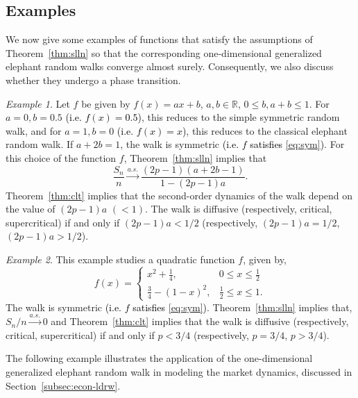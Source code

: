 \documentclass[12pt]{amsart}
\theoremstyle{plain}
\theoremstyle{remark}
\newtheorem{example}{Example}[subsection]
\numberwithin{equation}{section}
\begin{document}
\subsection{Examples}\label{subsec:examples-ldrw}

We now give some examples of functions that satisfy the assumptions of Theorem~\ref{thm:slln} so that the corresponding one-dimensional generalized elephant random walks converge almost surely. Consequently, we also discuss whether they undergo a phase transition. 

\begin{example}\label{geg-(-2)}
    Let $f$ be given by $f(x) = ax+b$, $a, b \in \mathbb{R}$, $0 \leq b, a+b \leq 1$. For $a = 0, b = 0.5$ \textcolor{black}{(i.e. $f(x) = 0.5$)}, this reduces to the simple symmetric random walk, and for $a = 1, b = 0$ \textcolor{black}{(i.e. $f(x) = x$)}, this reduces to the classical elephant random walk. If $a+2b = 1$, the walk is symmetric \textcolor{black}{(i.e. $f$ satisfies \eqref{eq:sym})}. For this choice of the function $f$, Theorem~\ref{thm:slln} implies that
    \[
        \frac{S_n}{n} \stackrel{a.s.}{\to} \frac{(2p-1)(a+2b-1)}{1-(2p-1)a}.
    \]
    Theorem~\ref{thm:clt} implies that the second-order dynamics of the walk depend on the value of $(2p-1)a$ $(< 1)$. The walk is diffusive (respectively, critical, supercritical) if and only if $(2p-1)a < 1/2$ (respectively, $(2p-1)a = 1/2$, $(2p-1)a > 1/2$).
\end{example}

\begin{example}\label{geg-(-1)}
    This example studies a quadratic function $f$, given by, 
    \[
        f(x) = \begin{cases}
            x^2+\frac{1}{4}, & 0 \leq x \leq \frac{1}{2} \\
            \frac{3}{4}-(1-x)^2, & \frac{1}{2} \leq x \leq 1.
        \end{cases}
    \]
    The walk is symmetric \textcolor{black}{(i.e. $f$ satisfies \eqref{eq:sym})}. Theorem~\ref{thm:slln} implies that, ${S_n}/{n} \stackrel{a.s.}{\to} 0$ and 
    Theorem~\ref{thm:clt} implies that the walk is diffusive (respectively, critical, supercritical) if and only if $p < 3/4$ (respectively, $p = 3/4$, $p > 3/4$). 
\end{example}

The following example illustrates the application of the one-dimensional generalized elephant random walk in modeling the market dynamics, discussed in Section~\ref{subsec:econ-ldrw}. 
\end{document}
